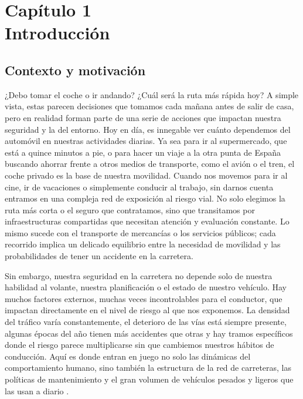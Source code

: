 \documentclass[twoside,a4paper,12pt,onecolumn,openany]{book}
\begin{document}
\setcounter{chapter}{1}
\chapter*{Capítulo 1 \\ \vspace{1cm} Introducción}


\section{Contexto y motivación}
\vspace{0.5cm}

¿Debo tomar el coche o ir andando? ¿Cuál será la ruta más rápida hoy? A simple vista, estas parecen decisiones que tomamos cada mañana antes de salir de casa, pero en realidad forman parte de una serie de acciones que impactan nuestra seguridad y la del entorno. Hoy en día, es innegable ver cuánto dependemos del automóvil en nuestras actividades diarias. Ya sea para ir al supermercado, que está a quince minutos a pie, o para hacer un viaje a la otra punta de España buscando ahorrar frente a otros medios de transporte, como el avión o el tren, el coche privado es la base de nuestra movilidad. Cuando nos movemos para ir al cine, ir de vacaciones o simplemente conducir al trabajo, sin darnos cuenta entramos en una compleja red de exposición al riesgo vial. No solo elegimos la ruta más corta o el seguro que contratamos, sino que transitamos por infraestructuras compartidas que necesitan atención y evaluación constante. Lo mismo sucede con el transporte de mercancías o los servicios públicos; cada recorrido implica un delicado equilibrio entre la necesidad de movilidad y las probabilidades de tener un accidente en la carretera.

\vspace{0.5cm}

Sin embargo, nuestra seguridad en la carretera no depende solo de nuestra habilidad al volante, nuestra planificación o el estado de nuestro vehículo. Hay muchos factores externos, muchas veces incontrolables para el conductor, que impactan directamente en el nivel de riesgo al que nos exponemos. La densidad del tráfico varía constantemente, el deterioro de las vías está siempre presente, algunas épocas del año tienen más accidentes que otras \cite{anuarioaccidentes} y hay tramos específicos donde el riesgo parece multiplicarse sin que cambiemos nuestros hábitos de conducción. Aquí es donde entran en juego no solo las dinámicas del comportamiento humano, sino también la estructura de la red de carreteras, las políticas de mantenimiento y el gran volumen de vehículos pesados y ligeros que las usan a diario \cite{mantenimientocarreteras}.
\end{document}
